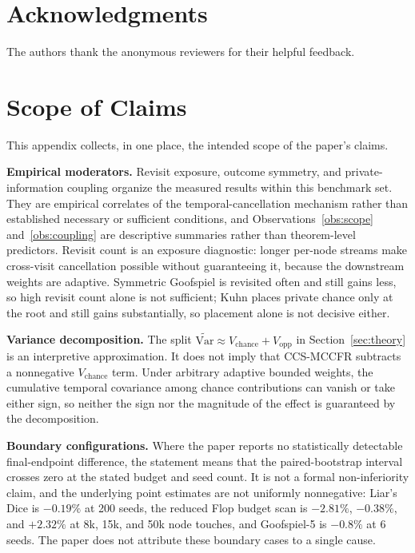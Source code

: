 \documentclass[11pt]{article}
\begin{document}
\section*{Acknowledgments}

The authors thank the anonymous reviewers for their helpful feedback.




\appendix

\section{Scope of Claims}
\label{app:scope}

This appendix collects, in one place, the intended scope of the paper's claims.

\textbf{Empirical moderators.} Revisit exposure, outcome symmetry, and private-information coupling organize the measured results within this benchmark set. They are empirical correlates of the temporal-cancellation mechanism rather than established necessary or sufficient conditions, and Observations~\ref{obs:scope} and~\ref{obs:coupling} are descriptive summaries rather than theorem-level predictors. Revisit count is an exposure diagnostic: longer per-node streams make cross-visit cancellation possible without guaranteeing it, because the downstream weights are adaptive. Symmetric Goofspiel is revisited often and still gains less, so high revisit count alone is not sufficient; Kuhn places private chance only at the root and still gains substantially, so placement alone is not decisive either.

\textbf{Variance decomposition.} The split $\widetilde{\mathrm{Var}} \approx V_{\mathrm{chance}} + V_{\mathrm{opp}}$ in Section~\ref{sec:theory} is an interpretive approximation. It does not imply that CCS-MCCFR subtracts a nonnegative $V_{\mathrm{chance}}$ term. Under arbitrary adaptive bounded weights, the cumulative temporal covariance among chance contributions can vanish or take either sign, so neither the sign nor the magnitude of the effect is guaranteed by the decomposition.

\textbf{Boundary configurations.} Where the paper reports no statistically detectable final-endpoint difference, the statement means that the paired-bootstrap interval crosses zero at the stated budget and seed count. It is not a formal non-inferiority claim, and the underlying point estimates are not uniformly nonnegative: Liar's Dice is $-0.19\%$ at 200 seeds, the reduced Flop budget scan is $-2.81\%$, $-0.38\%$, and $+2.32\%$ at 8k, 15k, and 50k node touches, and Goofspiel-5 is $-0.8\%$ at 6 seeds. The paper does not attribute these boundary cases to a single cause.
\end{document}
